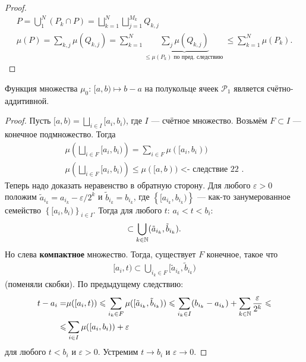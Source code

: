 \begin{proof}
 \begin{align*}
  P = \bigcup_1^N (P_k \cap P) = \bigsqcup_{k=1}^N \bigsqcup_{j=1}^{M_k} Q_{k,j} \\
  \mu(P) = \sum_{k,j}^{} \mu(Q_{k,j}) = \sum_{k=1}^{N} \underbrace{\sum_j \mu(Q_{k,j})}_{\leqslant \mu(P_k) \text{ по пред. следствию }} \leqslant \sum_{k=1}^{N} \mu(P_k)
 .\end{align*}
\end{proof}
\begin{thm}
 Функция множества $ \mu_0 \colon\, [a, b) \mapsto b - a $ на полукольце ячеек $ \mathcal{P}_1 $ является счётно-аддитивной.
\end{thm}
\begin{proof}
 Пусть $ [a, b) = \bigsqcup_{i \in I} [a_i, b_i) $, где $ I $ --- счётное множество. Возьмём $ F \subset I $ --- конечное подмножество. Тогда
 \begin{align*}
  \mu\left( \bigsqcup_{i \in F} [a_i, b_i) \right) = \sum_{i \in F}^{} \mu( [a_i, b_i) ) \\
  \mu\left( \bigsqcup_{i \in F} [a_i, b_i) \right) \leqslant \mu([a, b)) \text { <- следствие 22 }
 .\end{align*} Теперь надо доказать неравенство в обратную сторону. Для любого $ \varepsilon > 0 $ положим $ \tilde a_{i_k} = a_{i_k} - \varepsilon/2^k $ и $ \tilde b_{i_k} = b_{i_k} $, где $ \left\{ [a_{i_k}, b_{i_k}) \right\}  $ --- как-то занумерованное семейство $ \left\{ [a_i, b_i) \right\}_{i \in I}  $. Тогда для любого $ t $: $ a_i < t < b_i $:
 \begin{align*}
  [a_i, t] \subset \bigcup_{k \in \N} (\tilde a_{i_k}, \tilde b_{i_k})
 .\end{align*} Но слева \textbf{компактное} множество. Тогда, существует $ F $ конечное, такое что
 \begin{align*}
  [a_i, t) \subset \bigcup_{i_k \in F} [\tilde a_{i_k}, \tilde b_{i_k})
 \end{align*} (поменяли скобки). По предыдущему следствию:
 \begin{align*}
  t - a_i = &\mu([a_i, t)) \leqslant \sum_{i_k \in F}^{} \mu([\tilde a_{i_k}, \tilde b_{i_k})) \leqslant \sum_{i_k \in I}^{} (b_{i_k} - a_{i_k}) + \sum_{k \in \mathbb{N}} \frac{\varepsilon}{2^k} \leqslant \\
  \leqslant &\sum_{i \in I} \mu([a_i, b_i)) + \varepsilon
 \end{align*} для любого $ t < b_i $ и $ \varepsilon > 0 $. Устремим $ t \to b_i $ и $ \varepsilon \to 0 $.
\end{proof}
